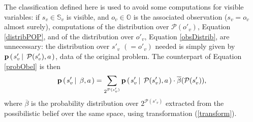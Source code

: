 The classification defined here is used to avoid some computations for visible variables:
if $s_{v} \in \mathbb{S}_v$ is visible, and $o_{v} \in \mathbb{O}$ is the associated observation ($s_v=o_v$ almost surely), 
computations of the distribution over $\mathcal{P}(o'_v)$, Equation \ref{distribPOP}, and
of the distribution over $o'_v$, Equation \ref{obsDistrib}, are unnecessary: the distribution 
over $s'_v$ $(=o'_v)$ needed is simply given by $\textbf{p} \left( \left.  s'_v \, \right| \left. \, \mathcal{P}(s'_v), a  \right. \right) $, 
data of the original problem. The counterpart of Equation \ref{probObel} is then
\begin{equation}
\label{probSVbel}
\textbf{p} \left( \left.  s'_v \, \right| \left. \, \beta, a  \right. \right) = \sum_{2^{\mathcal{P}(s'_v)}} \textbf{p} \left( \left.  s'_v \, \right| \left. \, \mathcal{P}(s'_v), a  \right. \right) \cdot \overline{\beta}(\mathcal{P}(s'_v)),
\end{equation}
where $\overline{\beta}$ is the probability distribution over $2^{\mathcal{P}(s'_v)}$ 
extracted from the possibilistic belief over the same space, using transformation (\ref{transform}).



